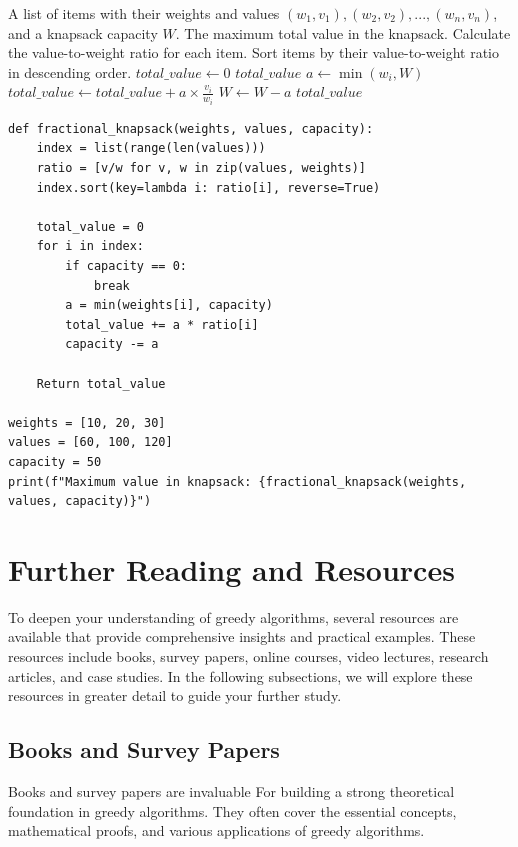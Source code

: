 \documentclass[12pt]{book} %
\begin{document}
\begin{itemize}
    \begin{algorithm}
    \caption{Greedy Fractional Knapsack Algorithm}
    \begin{algorithmic}[1]
    \Require A list of items with their weights and values $(w_1, v_1), (w_2, v_2), ..., (w_n, v_n)$, and a knapsack capacity $W$.
    \Ensure The maximum total value in the knapsack.
    \State Calculate the value-to-weight ratio for each item.
    \State Sort items by their value-to-weight ratio in descending order.
    \State $total\_value \leftarrow 0$
            \Return $total\_value$
        \EndIf
        \State $a \leftarrow \min(w_i, W)$
        \State $total\_value \leftarrow total\_value + a \times \frac{v_i}{w_i}$
        \State $W \leftarrow W - a$
    \EndFor
    \Return $total\_value$
    \end{algorithmic}
    \end{algorithm}

    \FloatBarrier
    \begin{lstlisting}
def fractional_knapsack(weights, values, capacity):
    index = list(range(len(values)))
    ratio = [v/w for v, w in zip(values, weights)]
    index.sort(key=lambda i: ratio[i], reverse=True)
    
    total_value = 0
    for i in index:
        if capacity == 0:
            break
        a = min(weights[i], capacity)
        total_value += a * ratio[i]
        capacity -= a
        
    Return total_value

weights = [10, 20, 30]
values = [60, 100, 120]
capacity = 50
print(f"Maximum value in knapsack: {fractional_knapsack(weights, values, capacity)}")
    \end{lstlisting}
    \FloatBarrier
\end{itemize}

\section{Further Reading and Resources}
To deepen your understanding of greedy algorithms, several resources are available that provide comprehensive insights and practical examples. These resources include books, survey papers, online courses, video lectures, research articles, and case studies. In the following subsections, we will explore these resources in greater detail to guide your further study.

\subsection{Books and Survey Papers}
Books and survey papers are invaluable For building a strong theoretical foundation in greedy algorithms. They often cover the essential concepts, mathematical proofs, and various applications of greedy algorithms.
\end{document}
